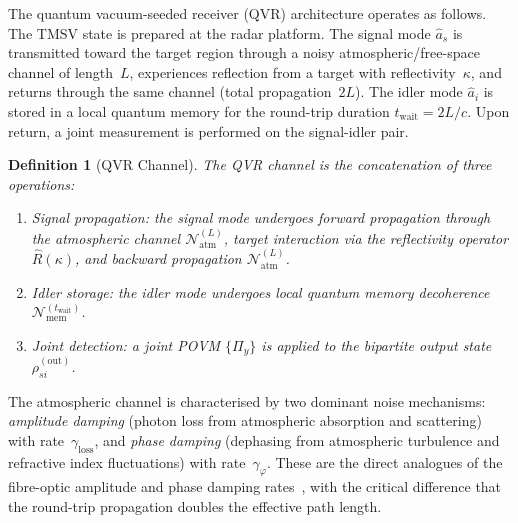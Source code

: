 \documentclass[journal]{IEEEtran}
\newtheorem{definition}{Definition}
\begin{document}
The quantum vacuum-seeded receiver (QVR) architecture operates as follows. The TMSV state is prepared at the radar platform. The signal mode $\hat{a}_s$ is transmitted toward the target region through a noisy atmospheric/free-space channel of length~$L$, experiences reflection from a target with reflectivity~$\kappa$, and returns through the same channel (total propagation~$2L$). The idler mode $\hat{a}_i$ is stored in a local quantum memory for the round-trip duration $t_{\text{wait}} = 2L/c$. Upon return, a joint measurement is performed on the signal-idler pair.

\begin{definition}[QVR Channel]\label{def:qvr_channel}
The QVR channel is the concatenation of three operations:
\begin{enumerate}
    \item[(i)] \textit{Signal propagation}: the signal mode undergoes forward propagation through the atmospheric channel $\mathcal{N}_{\text{atm}}^{(L)}$, target interaction via the reflectivity operator $\hat{R}(\kappa)$, and backward propagation $\mathcal{N}_{\text{atm}}^{(L)}$.
    \item[(ii)] \textit{Idler storage}: the idler mode undergoes local quantum memory decoherence $\mathcal{N}_{\text{mem}}^{(t_{\text{wait}})}$.
    \item[(iii)] \textit{Joint detection}: a joint POVM $\{\Pi_y\}$ is applied to the bipartite output state $\rho_{si}^{(\text{out})}$.
\end{enumerate}
\end{definition}

The atmospheric channel is characterised by two dominant noise mechanisms: \textit{amplitude damping} (photon loss from atmospheric absorption and scattering) with rate~$\gamma_{\text{loss}}$, and \textit{phase damping} (dephasing from atmospheric turbulence and refractive index fluctuations) with rate~$\gamma_{\varphi}$. These are the direct analogues of the fibre-optic amplitude and phase damping rates~\cite{gautum2024rigorous}, with the critical difference that the round-trip propagation doubles the effective path length.
\end{document}
